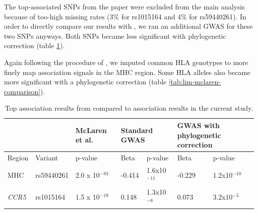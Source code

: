 \documentclass[]{article}
\begin{document}
\begin{doublespace}
The top-associated SNPs from the \citet{McLaren2015} paper were excluded from the main analysis because of too-high missing rates (3\% for rs1015164 and 4\% for rs59440261). In order to directly compare our results with \citet{McLaren2015}, we ran an additional GWAS for these two SNPs anyways. Both SNPs became less significant with phylogenetic correction (table \ref{tab:comp-gwas}).

Again following the procedure of \citet{McLaren2015}, we imputed common HLA genotypes to more finely map association signals in the MHC region. Some HLA alleles also became more significant with a phylogenetic correction (table \ref{tab:lim-mclaren-comparison}).

\begin{table}[H]
	\begin{center}
		\begin{tabular}{p{1cm}p{2cm}p{2.5cm}p{1cm}p{2cm}p{1cm}p{2cm}} %
			\hline
			& & McLaren et al.  & \multicolumn{2}{l}{Standard GWAS } & \multicolumn{2}{l}{GWAS with phylogenetic correction} \\ 
			\hline
			Region & Variant & p-value & Beta & p-value & Beta & p-value \\
			\hline
			MHC & rs59440261 & 2.0 x 10$^{-83}$ & -0.414 & 1.6x10$^{-11}$ & -0.229 & 1.2x10$^{-10}$ \\
			\emph{CCR5} & rs1015164 & 1.5 x 10$^{-19}$ & 0.148 & 1.3x10$^{-6}$ & 0.073 & 3.2x10$^{-5}$ \\			
			\hline
		\end{tabular}
		\caption{Top association results from \citet{McLaren2015} compared to association results in the current study.}
		\label{tab:comp-gwas}
	\end{center}
\end{table}


\end{doublespace}
\end{document}

